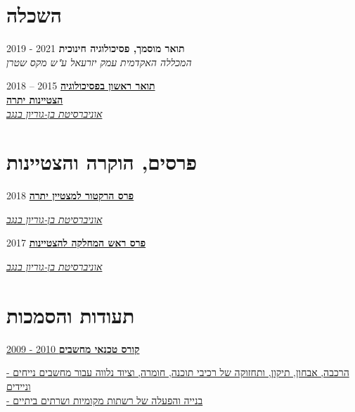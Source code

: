 \documentclass[
	12pt,a4paper %
]{article}
\begin{document}
\setRTL
\begin{hebrew}
\begin{paracol}{2} %

\section{השכלה}
\textbf{תואר מוסמך, פסיכולוגיה חינוכית} \hfill 2021 - 2019 \\
\textit{המכללה האקדמית עמק יזרעאל ע"ש מקס שטרן}

\textbf{\href{https://loona-il.000webhostapp.com/resume-references/BA-and-honorary.pdf}{תואר ראשון בפסיכולוגיה}} \hfill 2015 -- 2018 \\
\textbf{\href{https://loona-il.000webhostapp.com/resume-references/BA-and-honorary.pdf}{הצטיינות יתרה}} \\
\textit{\href{https://loona-il.000webhostapp.com/resume-references/BA-and-honorary.pdf}{אוניברסיטת בן-גוריון בנגב}}

\section{פרסים, הוקרה והצטיינות}
\href{https://loona-il.000webhostapp.com/resume-references/BA-and-honorary.pdf}{\textbf{פרס הרקטור למצטיין יתרה}} \hfill 2018

\textit{\href{https://loona-il.000webhostapp.com/resume-references/BA-and-honorary.pdf}{אוניברסיטת בן-גוריון בנגב}}

\href{https://loona-il.000webhostapp.com/resume-references/BA-and-honorary.pdf}{\textbf{פרס ראש המחלקה להצטיינות}} \hfill 2017

\textit{\href{https://loona-il.000webhostapp.com/resume-references/BA-and-honorary.pdf}{אוניברסיטת בן-גוריון בנגב}}

\section{תעודות והסמכות}

\href{https://loona-il.000webhostapp.com/resume-references/computer-technitian-certificate.jpg}{\textbf{\large קורס טכנאי מחשבים} \hfill 2010 - 2009}

\href{https://loona-il.000webhostapp.com/resume-references/computer-technitian-certificate.jpg}{
- הרכבה, אבחון, תיקון, ותחזוקה של רכיבי תוכנה, חומרה, וציוד נלווה עבור מחשבים נייחים וניידים \\
- בנייה והפעלה של רשתות מקומיות ושרתים ביתיים}


\end{paracol}
\end{hebrew}
\end{document}
